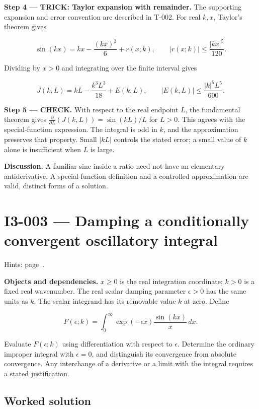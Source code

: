 \documentclass[11pt,oneside,openany]{book}
\begin{document}
\begingroup\color{TrickPurple}
\textbf{Step 4 --- TRICK: Taylor expansion with remainder.} The supporting expansion and error convention are described in T-002. For real \(k,x\), Taylor's theorem gives

\[
\sin(kx)=kx-\frac{(kx)^3}{6}+r(x;k),\qquad |r(x;k)|\le\frac{|kx|^5}{120}.
\]

Dividing by \(x>0\) and integrating over the finite interval gives

\[
J(k,L)=kL-\frac{k^3L^3}{18}+E(k,L),\qquad
|E(k,L)|\le\frac{|k|^5L^5}{600}.
\]

\endgroup
\textbf{Step 5 --- CHECK.} With respect to the real endpoint \(L\), the fundamental theorem gives \(\frac{\partial}{\partial L}(J(k,L))=\sin(kL)/L\) for \(L>0\). This agrees with the special-function expression. The integral is odd in \(k\), and the approximation preserves that property. Small \(|kL|\) controls the stated error; a small value of \(k\) alone is insufficient when \(L\) is large.

\textbf{Discussion.} A familiar sine inside a ratio need not have an elementary antiderivative. A special-function definition and a controlled approximation are valid, distinct forms of a solution.
\clearpage
\section{I3-003 --- Damping a conditionally convergent oscillatory integral}
\label{problem:I3-003}
{\small Hints: page~\pageref{hints:I3-003}.}\par\medskip

\textbf{Objects and dependencies.} \(x\ge0\) is the real integration coordinate; \(k>0\) is a fixed real wavenumber. The real scalar damping parameter \(\epsilon>0\) has the same units as \(k\). The scalar integrand has its removable value \(k\) at zero. Define

\[
F(\epsilon;k)=\int_0^\infty \exp(-\epsilon x)\frac{\sin(kx)}{x}\,dx.
\]

Evaluate \(F(\epsilon;k)\) using differentiation with respect to \(\epsilon\). Determine the ordinary improper integral with \(\epsilon=0\), and distinguish its convergence from absolute convergence. Any interchange of a derivative or a limit with the integral requires a stated justification.
\subsection*{Worked solution}
\end{document}

